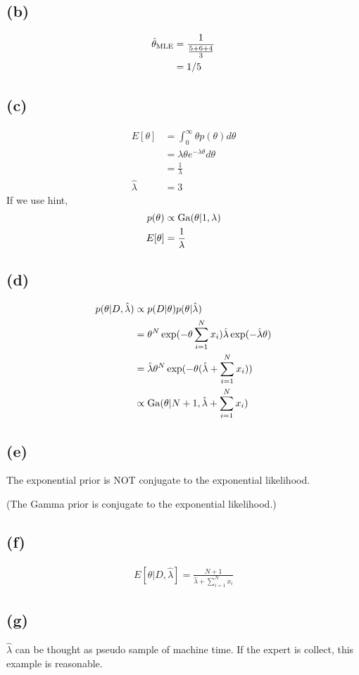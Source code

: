 \documentclass{jsarticle}
\begin{document}
\subsection*{(b)}
\begin{align}
\hat{\theta}_{\rm MLE} & = \frac{1}{\frac{5+6+4}{3}}\\ & = 1/5
\end{align}
\subsection*{(c)}
\begin{align}
E[\theta] & = \int_{0}^{\infty}\theta p(\theta)d\theta \\
& = \lambda \theta e^{-\lambda \theta}d\theta\\
& = \frac{1}{\lambda}\\
\hat{\lambda} & = 3
\end{align}
If we use hint, 
\begin{align}
p(\theta) & \propto {\rm Ga}(\theta|1, \lambda)\\
E[\theta] & = \frac{1}{\lambda}
\end{align}
\subsection*{(d)}
\begin{align}
p(\theta|D,\hat{\lambda}) & \propto p(D|\theta)p(\theta|\hat{\lambda})\\
& = \theta^N \exp(-\theta \sum_{i=1}^{N}x_i)\hat{\lambda}\exp(-\hat{\lambda}\theta)\\
& = \hat{\lambda}\theta^N\exp(-\theta(\hat{\lambda}+\sum_{i=1}^{N}x_i))\\
& \propto {\rm Ga}(\theta|N+1, \hat{\lambda}+\sum_{i=1}^{N}x_i)
\end{align}
\subsection*{(e)}
The exponential prior is NOT conjugate to the exponential likelihood.

(The Gamma prior is conjugate to the exponential likelihood.)
\subsection*{(f)}
\begin{align}
E[\theta|D,\hat{\lambda}]=\frac{N+1}{\hat{\lambda}+\sum_{i=1}^{N}x_i}
\end{align}
\subsection*{(g)}
$\hat{\lambda}$ can be thought as pseudo sample of machine time. If the expert is collect, this example is reasonable.
\end{document}
